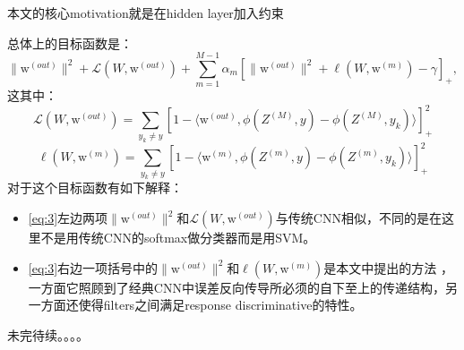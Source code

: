 \documentclass{article}
\begin{document}
\begin{CJK}{UTF8}{gbsn}
{\color{red}本文的核心motivation就是在hidden layer加入约束}


总体上的目标函数是：
\begin{equation}\label{eq:3}
 \|\mathrm{w}^{(out)}\|^2+\mathcal{L}(W,\mathrm{w}^{(out)})+\sum^{M-1}_{m=1}\alpha_m\left[\|\mathrm{w}^{(out)}\|^2+\ell(W,\mathrm{w}^{(m)})-\gamma\right]_+, \end{equation}
这其中：
\begin{equation}
\mathcal{L}(W,\mathrm{w}^{(out)})=\sum_{y_k\neq y}\left[1-\langle\mathrm{w}^{(out)},\phi(Z^{(M)},y)-\phi(Z^{(M)},y_k)\rangle\right]^2_+
\end{equation}
\begin{equation} 
\ell(W,\mathrm{w}^{(m)})=\sum_{y_k\neq y}\left[1-\langle\mathrm{w}^{(m)},\phi(Z^{(m)},y)-\phi(Z^{(m)},y_k)\rangle\right]^2_+
\end{equation}
对于这个目标函数有如下解释：
\begin{itemize}
\item\eqref{eq:3}左边两项$\|\mathrm{w}^{(out)}\|^2$和$\mathcal{L}(W,\mathrm{w}^{(out)})$与传统CNN相似，不同的是在这里不是用传统CNN的softmax做分类器而是用SVM。
\item\eqref{eq:3}右边一项括号中的$\|\mathrm{w}^{(out)}\|^2$和$\ell(W,\mathrm{w}^{(m)})$是本文中提出的方法
，一方面它照顾到了经典CNN中误差反向传导所必须的自下至上的传递结构，另一方面还使得filters之间满足response discriminative的特性。
\end{itemize}
未完待续。。。。








\end{CJK}
\end{document}
